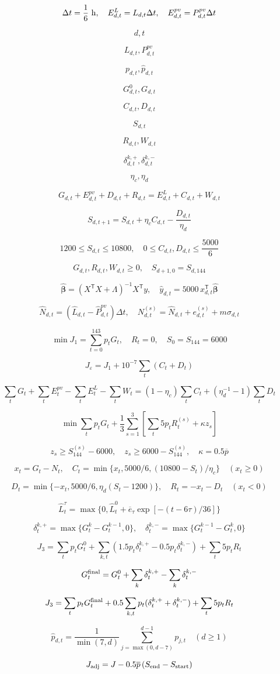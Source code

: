 \[
\Delta t=\frac{1}{6}\ {\rm h},\quad E^L_{d,t}=L_{d,t}\Delta t,\quad E^{pv}_{d,t}=P^{pv}_{d,t}\Delta t
\]

\[
d,t
\]

\[
L_{d,t},P^{pv}_{d,t}
\]

\[
p_{d,t},\widehat p_{d,t}
\]

\[
G^0_{d,t},G_{d,t}
\]

\[
C_{d,t},D_{d,t}
\]

\[
S_{d,t}
\]

\[
R_{d,t},W_{d,t}
\]

\[
\delta^{k,+}_{d,t},\delta^{k,-}_{d,t}
\]

\[
\eta_c,\eta_d
\]

\[
G_{d,t}+E^{pv}_{d,t}+D_{d,t}+R_{d,t}=E^L_{d,t}+C_{d,t}+W_{d,t}
\]

\[
S_{d,t+1}=S_{d,t}+\eta_c C_{d,t}-\frac{D_{d,t}}{\eta_d}
\]

\[
1200\leq S_{d,t}\leq10800,\quad 0\leq C_{d,t},D_{d,t}\leq\frac{5000}{6}
\]

\[
G_{d,t},R_{d,t},W_{d,t}\geq0,\quad S_{d+1,0}=S_{d,144}
\]

\[
\widehat{\boldsymbol\beta}=(X^{\mathsf T}X+\Lambda)^{-1}X^{\mathsf T}y,\quad \widehat y_{d,t}=5000\,x_{d,t}^{\mathsf T}\widehat{\boldsymbol\beta}
\]

\[
\widehat N_{d,t}=(\widehat L_{d,t}-\widehat P^{pv}_{d,t})\Delta t,\quad N^{(s)}_{d,t}=\widehat N_{d,t}+e^{(s)}_{d,t}+m\sigma_{d,t}
\]

\[
\min J_1=\sum_{t=0}^{143}p_tG_t,\quad R_t=0,\quad S_0=S_{144}=6000
\]

\[
J_{\varepsilon}=J_1+10^{-7}\sum_t(C_t+D_t)
\]

\[
\sum_tG_t+\sum_tE^{pv}_t-\sum_tE^L_t-\sum_tW_t=(1-\eta_c)\sum_tC_t+(\eta_d^{-1}-1)\sum_tD_t
\]

\[
\min\sum_t p_tG_t+\frac{1}{3}\sum_{s=1}^{3}\left[\sum_t5p_tR_t^{(s)}+\kappa z_s\right]
\]

\[
z_s\geq S_{144}^{(s)}-6000,\quad z_s\geq6000-S_{144}^{(s)},\quad \kappa=0.5\overline p
\]

\[
x_t=G_t-N_t,\quad C_t=\min\{x_t,5000/6,(10800-S_t)/\eta_c\}\quad(x_t\geq0)
\]

\[
D_t=\min\{-x_t,5000/6,\eta_d(S_t-1200)\},\quad R_t=-x_t-D_t\quad(x_t<0)
\]

\[
\widehat L_t^{\tau}=\max\{0,\widehat L_t^0+\overline e_{\tau}\exp[-(t-6\tau)/36]\}
\]

\[
\delta_t^{k,+}=\max\{G_t^k-G_t^{k-1},0\},\quad\delta_t^{k,-}=\max\{G_t^{k-1}-G_t^k,0\}
\]

\[
J_3=\sum_t p_tG_t^0+\sum_{k,t}(1.5p_t\delta_t^{k,+}-0.5p_t\delta_t^{k,-})+\sum_t5p_tR_t
\]

\[
G_t^{\rm final}=G_t^0+\sum_k\delta_t^{k,+}-\sum_k\delta_t^{k,-}
\]

\[
J_3=\sum_t p_tG_t^{\rm final}+0.5\sum_{k,t}p_t(\delta_t^{k,+}+\delta_t^{k,-})+\sum_t5p_tR_t
\]

\[
\widehat p_{d,t}=\frac{1}{\min(7,d)}\sum_{j=\max(0,d-7)}^{d-1}p_{j,t}\quad(d\geq1)
\]

\[
J_{\rm adj}=J-0.5\overline p\,(S_{\rm end}-S_{\rm start})
\]